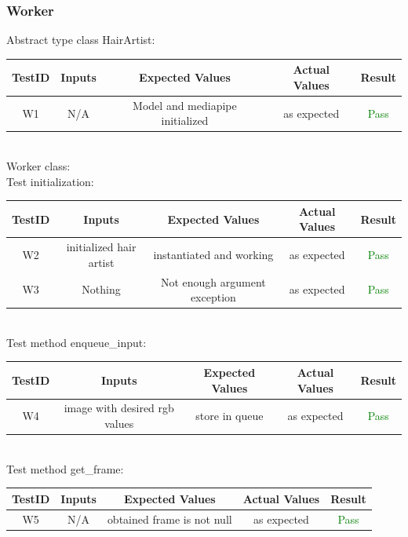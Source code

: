 \documentclass[12pt, oneside, openany, titlepage]{article}
\begin{document}
\subsubsection{Worker}
Abstract type class HairArtist: \\
\newline
\begin{tabular}{ |c|c|c|c|c| } 
 \hline
 TestID & Inputs & Expected Values & Actual Values & Result \\ 
 \hline
W1 & N/A & Model and mediapipe initialized & as expected & \textcolor{green}{Pass} \\ 
 \hline
\end{tabular} 
\\ \newline
Worker class: \\
Test initialization: \\
\newline
\begin{tabular}{ |c|c|c|c|c| } 
 \hline
 TestID & Inputs & Expected Values & Actual Values & Result \\ 
 \hline
W2 & initialized hair artist & instantiated and working & as expected & \textcolor{green}{Pass} \\
W3 & Nothing & Not enough argument exception & as expected & \textcolor{green}{Pass} \\
 \hline
\end{tabular}
\\ \newline
Test method enqueue\_input: \\
\newline
\begin{tabular}{ |c|c|c|c|c| } 
 \hline
 TestID & Inputs & Expected Values & Actual Values & Result \\ 
 \hline
W4 & image with desired rgb values & store in queue & as expected & \textcolor{green}{Pass} \\
 \hline
\end{tabular}
\\ \newline
Test method get\_frame: \\
\newline
\begin{tabular}{ |c|c|c|c|c| } 
 \hline
 TestID & Inputs & Expected Values & Actual Values & Result \\ 
 \hline
W5 & N/A & obtained frame is not null & as expected & \textcolor{green}{Pass} \\
 \hline
\end{tabular}
\end{document}
